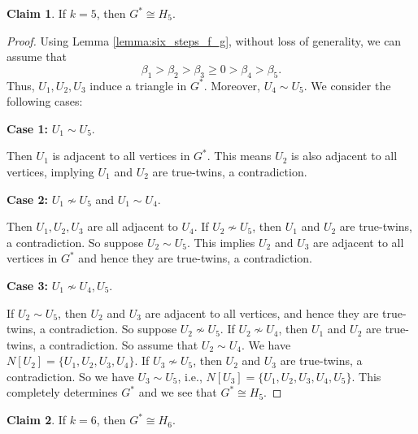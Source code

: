 \documentclass[11pt]{article}
\theoremstyle{plain}
\theoremstyle{definition}
\newtheorem{claim}{Claim}[section]
\numberwithin{equation}{section}
\begin{document}
\begin{claim} 
If $k = 5$, then $G^*\cong H_5$.    
\end{claim}

\begin{proof}
Using Lemma \ref{lemma:six_steps_f_g}, without loss of generality, we can assume that 
\[ 
\beta_1 > \beta_2 > \beta_3 \ge 0 > \beta_4 > \beta_5.
\] 
Thus, $U_1,U_2, U_3$ induce a triangle in $G^*$. Moreover, $U_4\sim U_5$. We consider the following cases:

\textbf{Case 1:} $U_1\sim U_5$. 

Then $U_1$ is adjacent to all vertices in $G^*$. This means $U_2$ is also adjacent to all vertices, 
implying $U_1$ and $U_2$ are true-twins, a contradiction.

\textbf{Case 2:} $U_1\nsim U_5$ and $U_1\sim U_4$.

Then $U_1, U_2, U_3$ are all adjacent to $U_4$. If $U_2\nsim U_5$, then $U_1$ and $U_2$ 
are true-twins, a contradiction. So suppose $U_2\sim U_5$. This implies $U_2$ and $U_3$ 
are adjacent to all vertices in $G^*$ and hence they are true-twins, a contradiction.

\textbf{Case 3:} $U_1\nsim U_4, U_5$. 

If $U_2\sim U_5$, then $U_2$ and $U_3$ are adjacent to all vertices, and hence they are true-twins, 
a contradiction. So suppose $U_2\nsim U_5$. If $U_2\nsim U_4$, then $U_1$ and $U_2$ are true-twins, 
a contradiction. So assume that $U_2\sim U_4$. We have $N[U_2] = \{U_1, U_2, U_3, U_4\}$. 
If $U_3\nsim U_5$, then $U_2$ and $U_3$ are true-twins, a contradiction. So we have $U_3\sim U_5$, 
i.e., $N[U_3] = \{U_1, U_2, U_3, U_4, U_5\}$. This completely determines $G^*$ and we see that $G^*\cong H_5$. 
\end{proof}

\begin{claim} 
If $k = 6$, then $G^*\cong H_6$.    
\end{claim}
\end{document}
